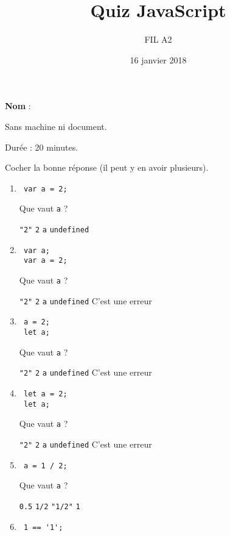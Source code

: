 \documentclass[a4paper, 12pt]{article}
\title{Quiz JavaScript}
\author{FIL A2}
\date{16 janvier 2018}
\newcommand{\choice}[1]{\Square\hspace{2pt} #1\hspace{5pt}}
\newcommand{\choicec}[1]{\Square\hspace{2pt} \lstinline{#1}\hspace{5pt}}
\begin{document}
\maketitle

\textbf{Nom} :

Sans machine ni document.

Durée : 20 minutes.

Cocher la bonne réponse (il peut y en avoir plusieurs).

\begin{enumerate}
\item \lstset{language=javascript}
\begin{lstlisting}
 var a = 2;
\end{lstlisting}

  Que vaut \lstinline{a} ?

  \choicec{"2"} \choicec{2} \choicec{a} \choicec{undefined}
\item \lstset{language=javascript}
\begin{lstlisting}
 var a;
 var a = 2;
\end{lstlisting}

  Que vaut \lstinline{a} ?

  \choicec{"2"} \choicec{2} \choicec{a} \choicec{undefined} \choice{C'est une erreur}
\item \lstset{language=javascript}
\begin{lstlisting}
 a = 2;
 let a;
\end{lstlisting}

  Que vaut \lstinline{a} ?

  \choicec{"2"} \choicec{2} \choicec{a} \choicec{undefined} \choice{C'est une erreur}
\item \lstset{language=javascript}
\begin{lstlisting}
 let a = 2;
 let a;
\end{lstlisting}

  Que vaut \lstinline{a} ?

  \choicec{"2"} \choicec{2} \choicec{a} \choicec{undefined} \choice{C'est une erreur}
\item \lstset{language=javascript}
\begin{lstlisting}
 a = 1 / 2;
\end{lstlisting}

  Que vaut \lstinline{a} ?

  \choicec{0.5} \choicec{1/2} \choicec{"1/2"} \choicec{1}
\item \lstset{language=javascript}
\begin{lstlisting}
 1 == '1';
\end{lstlisting}


\end{enumerate}
\end{document}

